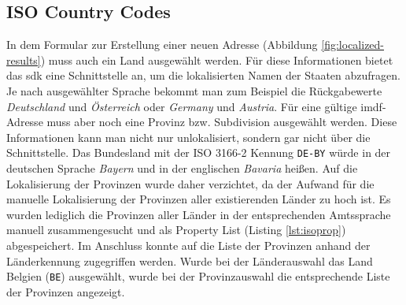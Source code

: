 \subsection{ISO Country Codes}
In dem Formular zur Erstellung einer neuen Adresse (Abbildung \ref{fig:localized-results}) muss auch ein Land ausgewählt werden.
Für diese Informationen bietet das \Gls{sdk} eine Schnittstelle an, um die lokalisierten Namen der Staaten abzufragen.
Je nach ausgewählter Sprache bekommt man zum Beispiel die Rückgabewerte \emph{Deutschland} und \emph{Österreich} oder \emph{Germany} und \emph{Austria}.
Für eine gültige \ac{imdf}-Adresse muss aber noch eine Provinz bzw. Subdivision ausgewählt werden.
Diese Informationen kann man nicht nur unlokalisiert, sondern gar nicht über die Schnittstelle.
Das Bundesland mit der ISO 3166-2 Kennung \texttt{DE-BY} würde in der deutschen Sprache \emph{Bayern} und in der englischen \emph{Bavaria} heißen.
Auf die Lokalisierung der Provinzen wurde daher verzichtet, da der Aufwand für die manuelle Lokalisierung der Provinzen aller existierenden Länder zu hoch ist.
Es wurden lediglich die Provinzen aller Länder in der entsprechenden Amtssprache manuell zusammengesucht und als Property List (Listing \ref{lst:isoprop}) abgespeichert.
Im Anschluss konnte auf die Liste der Provinzen anhand der Länderkennung zugegriffen werden.
Wurde bei der Länderauswahl das Land Belgien (\texttt{BE}) ausgewählt, wurde bei der Provinzauswahl die entsprechende Liste der Provinzen angezeigt.
